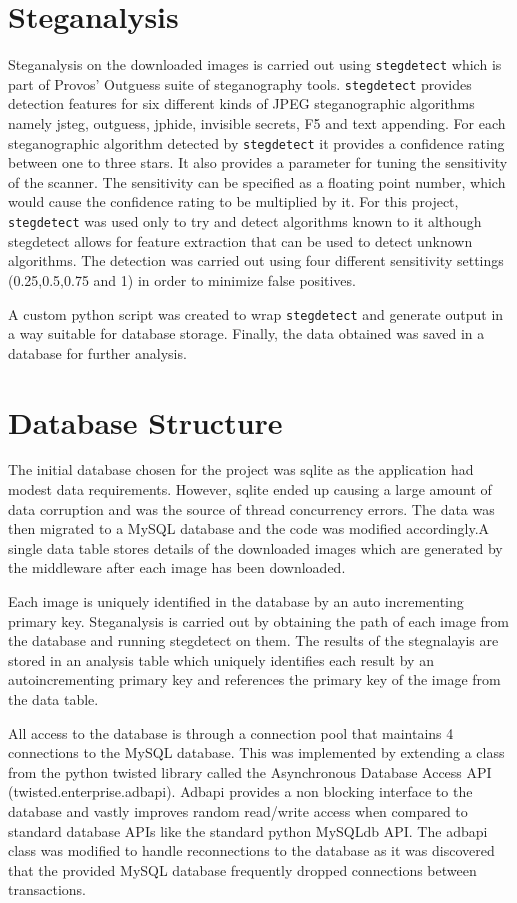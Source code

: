 \section {Steganalysis}
\label{sec:stegtool}
Steganalysis on the downloaded images is carried out using \texttt{stegdetect} which is part of Provos' Outguess suite of steganography tools. \texttt{stegdetect} provides detection features for six different kinds of JPEG steganographic algorithms namely jsteg, outguess, jphide, invisible secrets, F5 and text appending. For each steganographic algorithm detected by \texttt{stegdetect} it provides a confidence rating between one to three stars. It also provides a parameter for tuning the sensitivity of the scanner. The sensitivity can be specified as a floating point number, which would cause the confidence rating to be multiplied by it. For this project, \texttt{stegdetect} was used only to try and detect algorithms known to it although stegdetect allows for feature extraction that can be used to detect unknown algorithms. The detection was carried out using four different sensitivity settings (0.25,0.5,0.75 and 1) in order to minimize false positives.
\par A custom python script was created to wrap \texttt{stegdetect} and generate output in a way suitable for database storage. Finally, the data obtained was saved in a database for further analysis.
\section{Database Structure}
\label{sec:dbstructure}
The initial database chosen for the project was sqlite as the application had modest data requirements. However, sqlite ended up causing a large amount of data corruption and was the source of thread concurrency errors. The data was then migrated to a MySQL database and the code was modified accordingly.A single data table stores details of the downloaded images which are generated by the middleware after each image has been downloaded. 
\par Each image is uniquely identified in the database by an auto incrementing primary key. Steganalysis is carried out by obtaining the path of each image from the database and running stegdetect on them. The results of the stegnalayis are stored in an analysis table which uniquely identifies each result by an autoincrementing primary key and references the primary key of the image from the data table.
\par  All access to the database is through a connection pool that maintains 4 connections to the MySQL database. This was implemented by extending a class from the python twisted library called the Asynchronous Database Access API (twisted.enterprise.adbapi). Adbapi provides a non blocking interface to the database and vastly improves random read/write access when compared to standard database APIs like the standard python MySQLdb API. The adbapi class was modified to handle reconnections to the database as it was discovered that the provided MySQL database frequently dropped connections between transactions. 
